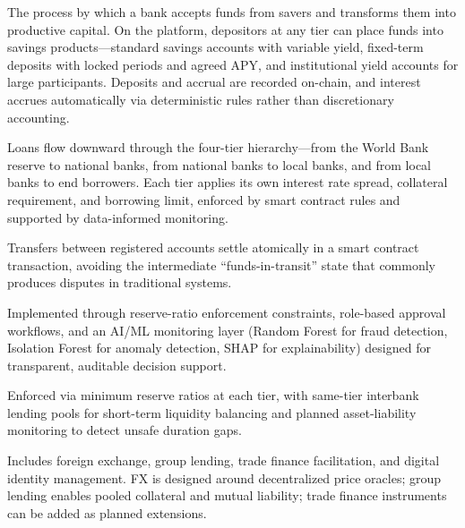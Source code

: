 \documentclass[acmsmall,screen,review]{acmart}
\begin{document}
\begin{description}[leftmargin=0pt]
\item[\textbf{Deposit Mobilization.}] The process by which a bank accepts funds from savers and transforms them into productive capital. On the platform, depositors at any tier can place funds into savings products---standard savings accounts with variable yield, fixed-term deposits with locked periods and agreed APY, and institutional yield accounts for large participants. Deposits and accrual are recorded on-chain, and interest accrues automatically via deterministic rules rather than discretionary accounting.
\item[\textbf{Credit Allocation.}] Loans flow downward through the four-tier hierarchy---from the World Bank reserve to national banks, from national banks to local banks, and from local banks to end borrowers. Each tier applies its own interest rate spread, collateral requirement, and borrowing limit, enforced by smart contract rules and supported by data-informed monitoring.
\item[\textbf{Payment and Settlement.}] Transfers between registered accounts settle atomically in a smart contract transaction, avoiding the intermediate ``funds-in-transit'' state that commonly produces disputes in traditional systems.
\item[\textbf{Risk Intermediation.}] Implemented through reserve-ratio enforcement constraints, role-based approval workflows, and an AI/ML monitoring layer (Random Forest for fraud detection, Isolation Forest for anomaly detection, SHAP for explainability) designed for transparent, auditable decision support.
\item[\textbf{Liquidity Management.}] Enforced via minimum reserve ratios at each tier, with same-tier interbank lending pools for short-term liquidity balancing and planned asset-liability monitoring to detect unsafe duration gaps.
\item[\textbf{Ancillary Financial Services.}] Includes foreign exchange, group lending, trade finance facilitation, and digital identity management. FX is designed around decentralized price oracles; group lending enables pooled collateral and mutual liability; trade finance instruments can be added as planned extensions.
\end{description}
\end{document}
